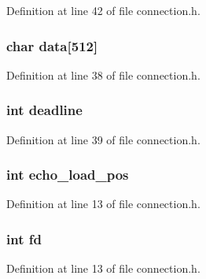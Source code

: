 Definition at line 42 of file connection.\+h.

\subsubsection[{\texorpdfstring{data}{data}}]{\setlength{\rightskip}{0pt plus 5cm}char data\mbox{[}512\mbox{]}}\hypertarget{structconnection_a5233f4a930689daddd3ad8ef607eba2d}{}\label{structconnection_a5233f4a930689daddd3ad8ef607eba2d}


Definition at line 38 of file connection.\+h.

\subsubsection[{\texorpdfstring{deadline}{deadline}}]{\setlength{\rightskip}{0pt plus 5cm}int deadline}\hypertarget{structconnection_a30d410aac9d815897af98403ade9fc25}{}\label{structconnection_a30d410aac9d815897af98403ade9fc25}


Definition at line 39 of file connection.\+h.

\subsubsection[{\texorpdfstring{echo\+\_\+load\+\_\+pos}{echo_load_pos}}]{\setlength{\rightskip}{0pt plus 5cm}int echo\+\_\+load\+\_\+pos}\hypertarget{structconnection_ad1e04a9c082c6992a98a404842e4662c}{}\label{structconnection_ad1e04a9c082c6992a98a404842e4662c}


Definition at line 13 of file connection.\+h.

\subsubsection[{\texorpdfstring{fd}{fd}}]{\setlength{\rightskip}{0pt plus 5cm}int fd}\hypertarget{structconnection_a6f8059414f0228f0256115e024eeed4b}{}\label{structconnection_a6f8059414f0228f0256115e024eeed4b}


Definition at line 13 of file connection.\+h.

